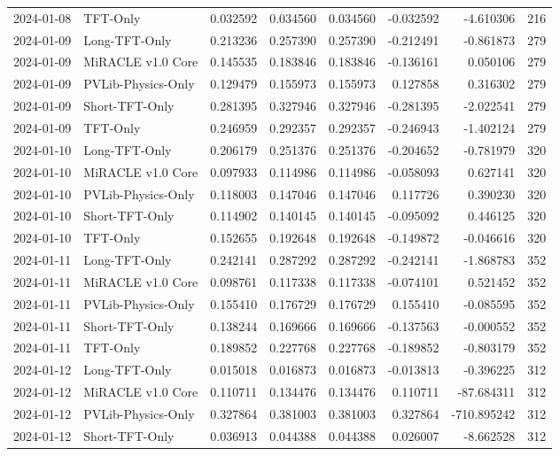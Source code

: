 \begin{tabular}{llrrrrrr}
2024-01-08 & TFT-Only & 0.032592 & 0.034560 & 0.034560 & -0.032592 & -4.610306 & 216 \\
2024-01-09 & Long-TFT-Only & 0.213236 & 0.257390 & 0.257390 & -0.212491 & -0.861873 & 279 \\
2024-01-09 & MiRACLE v1.0 Core & 0.145535 & 0.183846 & 0.183846 & -0.136161 & 0.050106 & 279 \\
2024-01-09 & PVLib-Physics-Only & 0.129479 & 0.155973 & 0.155973 & 0.127858 & 0.316302 & 279 \\
2024-01-09 & Short-TFT-Only & 0.281395 & 0.327946 & 0.327946 & -0.281395 & -2.022541 & 279 \\
2024-01-09 & TFT-Only & 0.246959 & 0.292357 & 0.292357 & -0.246943 & -1.402124 & 279 \\
2024-01-10 & Long-TFT-Only & 0.206179 & 0.251376 & 0.251376 & -0.204652 & -0.781979 & 320 \\
2024-01-10 & MiRACLE v1.0 Core & 0.097933 & 0.114986 & 0.114986 & -0.058093 & 0.627141 & 320 \\
2024-01-10 & PVLib-Physics-Only & 0.118003 & 0.147046 & 0.147046 & 0.117726 & 0.390230 & 320 \\
2024-01-10 & Short-TFT-Only & 0.114902 & 0.140145 & 0.140145 & -0.095092 & 0.446125 & 320 \\
2024-01-10 & TFT-Only & 0.152655 & 0.192648 & 0.192648 & -0.149872 & -0.046616 & 320 \\
2024-01-11 & Long-TFT-Only & 0.242141 & 0.287292 & 0.287292 & -0.242141 & -1.868783 & 352 \\
2024-01-11 & MiRACLE v1.0 Core & 0.098761 & 0.117338 & 0.117338 & -0.074101 & 0.521452 & 352 \\
2024-01-11 & PVLib-Physics-Only & 0.155410 & 0.176729 & 0.176729 & 0.155410 & -0.085595 & 352 \\
2024-01-11 & Short-TFT-Only & 0.138244 & 0.169666 & 0.169666 & -0.137563 & -0.000552 & 352 \\
2024-01-11 & TFT-Only & 0.189852 & 0.227768 & 0.227768 & -0.189852 & -0.803179 & 352 \\
2024-01-12 & Long-TFT-Only & 0.015018 & 0.016873 & 0.016873 & -0.013813 & -0.396225 & 312 \\
2024-01-12 & MiRACLE v1.0 Core & 0.110711 & 0.134476 & 0.134476 & 0.110711 & -87.684311 & 312 \\
2024-01-12 & PVLib-Physics-Only & 0.327864 & 0.381003 & 0.381003 & 0.327864 & -710.895242 & 312 \\
2024-01-12 & Short-TFT-Only & 0.036913 & 0.044388 & 0.044388 & 0.026007 & -8.662528 & 312 \\

\end{tabular}
